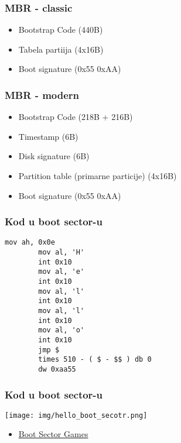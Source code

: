 \documentclass{beamer}
\begin{document}
\begin{frame}
    
    \frametitle{MBR - classic}
    \begin{itemize}
        \item Bootstrap Code (440B) \newline
        \item Tabela partiija (4x16B) \newline
        \item Boot signature (0x55 0xAA) \newline 
    \end{itemize}
\end{frame}

\begin{frame}
    \frametitle{MBR - modern}
    \begin{itemize}
        \item Bootstrap Code (218B + 216B) \newline
        \item Timestamp (6B) \newline
        \item Disk signature (6B) \newline
        \item Partition table (primarne particije) (4x16B) \newline
        \item Boot signature (0x55 0xAA)
    \end{itemize}
\end{frame}

\begin{frame}[fragile]
    \frametitle{Kod u boot sector-u}
    \begin{lstlisting}[language={[x86masm]Assembler}]
        mov ah, 0x0e
        mov al, 'H'
        int 0x10
        mov al, 'e'
        int 0x10
        mov al, 'l'
        int 0x10
        mov al, 'l'
        int 0x10
        mov al, 'o'
        int 0x10
        jmp $ 
        times 510 - ( $ - $$ ) db 0
        dw 0xaa55
    \end{lstlisting}
\end{frame}

\begin{frame}
    \frametitle{Kod u boot sector-u}
    \begin{center}
        \texttt{[image: img/hello\_boot\_secotr.png]}
    \end{center}
    \begin{itemize}
        \item \href{https://youtu.be/1UzTf0Qo37A}{Boot Sector Games}
    \end{itemize}
\end{frame}
\end{document}
